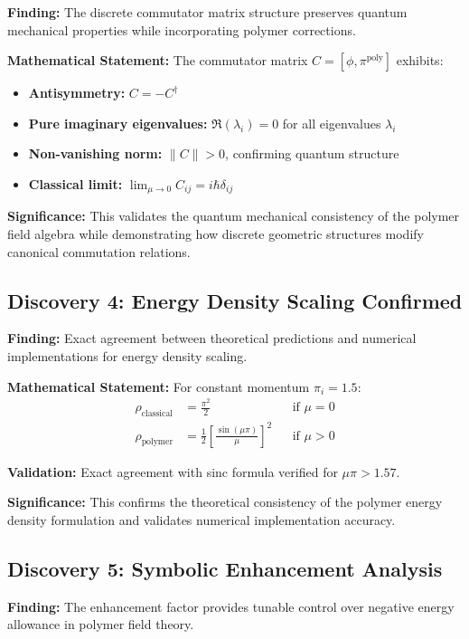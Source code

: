 \documentclass[11pt]{article}
\begin{document}
\textbf{Finding:} The discrete commutator matrix structure preserves quantum mechanical properties while incorporating polymer corrections.

\textbf{Mathematical Statement:}
The commutator matrix $C = [\phi, \pi^{\text{poly}}]$ exhibits:
\begin{itemize}
    \item \textbf{Antisymmetry:} $C = -C^\dagger$
    \item \textbf{Pure imaginary eigenvalues:} $\Re(\lambda_i) = 0$ for all eigenvalues $\lambda_i$
    \item \textbf{Non-vanishing norm:} $\|C\| > 0$, confirming quantum structure
    \item \textbf{Classical limit:} $\lim_{\mu \to 0} C_{ij} = i\hbar\delta_{ij}$
\end{itemize}

\textbf{Significance:} This validates the quantum mechanical consistency of the polymer field algebra while demonstrating how discrete geometric structures modify canonical commutation relations.

\subsection{Discovery 4: Energy Density Scaling Confirmed}

\textbf{Finding:} Exact agreement between theoretical predictions and numerical implementations for energy density scaling.

\textbf{Mathematical Statement:}
For constant momentum $\pi_i = 1.5$:
\begin{align}
\rho_{\text{classical}} &= \frac{\pi^2}{2} && \text{if } \mu = 0 \\
\rho_{\text{polymer}} &= \frac{1}{2}\left[\frac{\sin(\mu\pi)}{\mu}\right]^2 && \text{if } \mu > 0
\end{align}

\textbf{Validation:} Exact agreement with sinc formula verified for $\mu\pi > 1.57$.

\textbf{Significance:} This confirms the theoretical consistency of the polymer energy density formulation and validates numerical implementation accuracy.

\subsection{Discovery 5: Symbolic Enhancement Analysis}

\textbf{Finding:} The enhancement factor provides tunable control over negative energy allowance in polymer field theory.
\end{document}
